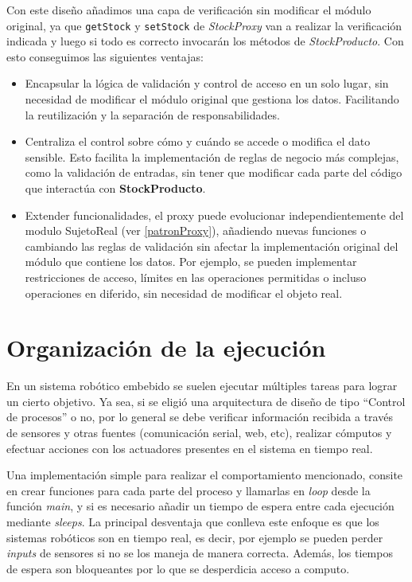 Con este diseño añadimos una capa de verificación sin modificar el módulo original, ya que \verb|getStock| y \verb|setStock| de \textit{StockProxy} van a realizar la verificación indicada y luego si todo es correcto invocarán los métodos de \textit{StockProducto}. Con esto conseguimos las siguientes ventajas:

\begin{itemize}
    \item Encapsular la lógica de validación y control de acceso en un solo lugar, sin necesidad de modificar el módulo original que gestiona los datos. Facilitando la reutilización y la separación de responsabilidades.

    \item Centraliza el control sobre cómo y cuándo se accede o modifica el dato sensible. Esto facilita la implementación de reglas de negocio más complejas, como la validación de entradas, sin tener que modificar cada parte del código que interactúa con \textbf{StockProducto}.

    \item Extender funcionalidades, el proxy puede evolucionar independientemente del modulo SujetoReal (ver \ref{patronProxy}), añadiendo nuevas funciones o cambiando las reglas de validación sin afectar la implementación original del módulo que contiene los datos. Por ejemplo, se pueden implementar restricciones de acceso, límites en las operaciones permitidas o incluso operaciones en diferido, sin necesidad de modificar el objeto real.
\end{itemize}

\section{Organización de la ejecución}
\label{orgEjecucion}

En un sistema robótico embebido se suelen ejecutar múltiples tareas para lograr un cierto objetivo. Ya sea, si se eligió una arquitectura de diseño de tipo ``Control de procesos'' o no, por lo general se debe verificar información recibida a través de sensores y otras fuentes (comunicación serial, web, etc), realizar cómputos y efectuar acciones con los actuadores presentes en el sistema en tiempo real.

Una implementación simple para realizar el comportamiento mencionado, consite en crear funciones para cada parte del proceso y llamarlas en \textit{loop} desde la función \textit{main}, y si es necesario añadir un tiempo de espera entre cada ejecución mediante \textit{sleeps}. La principal desventaja que conlleva este enfoque es que los sistemas robóticos son en tiempo real, es decir, por ejemplo se pueden perder \textit{inputs} de sensores si no se los maneja de manera correcta. Además, los tiempos de espera son bloqueantes por lo que se desperdicia acceso a computo.

